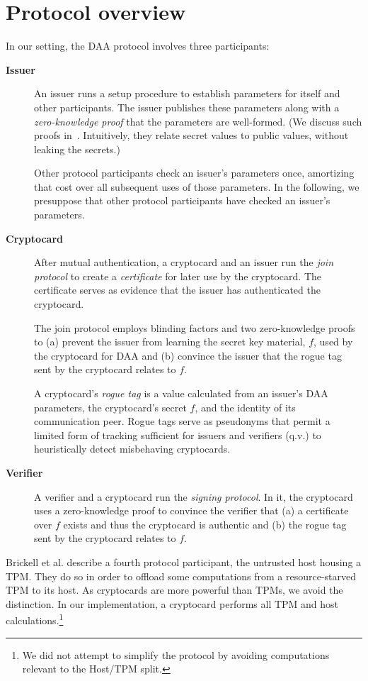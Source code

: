 \section{Protocol overview}

In our setting, the DAA protocol involves three participants:
\begin{description}

\item[\textbf{Issuer}]
An issuer runs a setup procedure to establish
parameters for itself and other participants.
The issuer publishes these parameters along with a
\emph{zero-knowledge proof} that the parameters
are well-formed. (We discuss such proofs in~. Intuitively,
they relate secret values to public values, without leaking the secrets.)

Other protocol participants check an issuer's parameters
once, amortizing that cost over all subsequent uses of those parameters.
In the following, we presuppose that other protocol participants have
checked an issuer's parameters.

\item[\textbf{Cryptocard}]
After mutual authentication, a cryptocard and an issuer run the \emph{join protocol}
to create a \emph{certificate} for later use by the cryptocard.
The certificate serves as evidence that the issuer has authenticated the cryptocard.

The join protocol employs blinding factors and two zero-knowledge proofs
to (a) prevent the issuer from learning the secret key material, $f$, used by the
cryptocard for DAA and (b) convince the issuer that the rogue tag
sent by the cryptocard relates to $f$.

A cryptocard's \emph{rogue tag} is a value calculated from an issuer's DAA parameters,
the cryptocard's secret $f$, and the identity of its communication peer.
Rogue tags serve as pseudonyms that permit a limited
form of tracking sufficient for issuers and verifiers (q.v.) to heuristically
detect misbehaving cryptocards.

\item[\textbf{Verifier}]
A verifier and a cryptocard run the \emph{signing protocol}.
In it, the cryptocard uses a zero-knowledge proof to convince
the verifier that (a) a certificate over $f$ exists and thus the cryptocard
is authentic and (b) the rogue tag sent by the cryptocard relates to $f$.

\end{description}
Brickell et al. describe a fourth protocol participant, the untrusted host
housing a TPM.
They do so in order to offload some computations from a resource-starved TPM
to its host.
As cryptocards are more powerful than TPMs, we avoid the distinction.
In our implementation, a cryptocard performs all TPM and
host calculations.\footnote{%
	We did not attempt to simplify the protocol
	by avoiding computations relevant to the Host/TPM split.}

